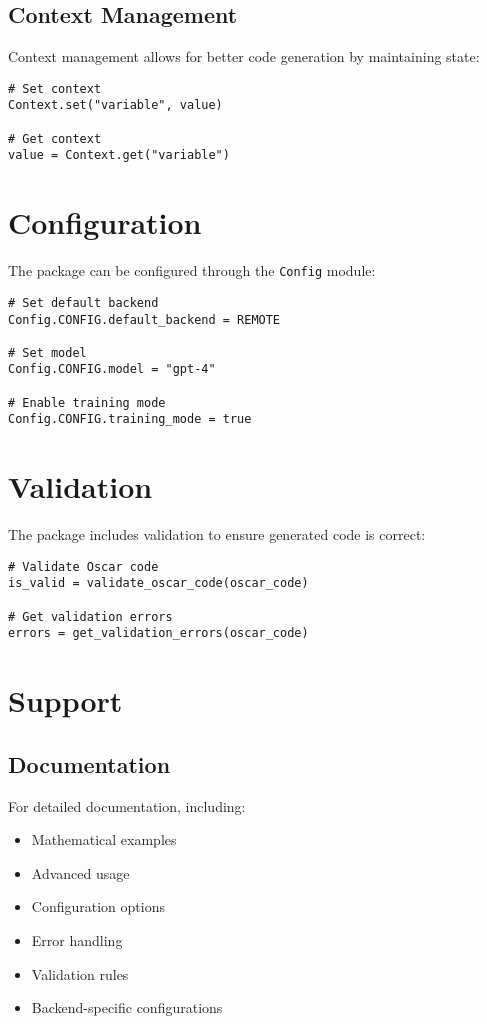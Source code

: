 \documentclass[11pt,a4paper]{article}
\newcommand{\modname}[1]{\texttt{#1}}
\begin{document}
\subsection{Context Management}

Context management allows for better code generation by maintaining state:

\begin{lstlisting}
# Set context
Context.set("variable", value)

# Get context
value = Context.get("variable")
\end{lstlisting}

\section{Configuration}

The package can be configured through the \modname{Config} module:

\begin{lstlisting}
# Set default backend
Config.CONFIG.default_backend = REMOTE

# Set model
Config.CONFIG.model = "gpt-4"

# Enable training mode
Config.CONFIG.training_mode = true
\end{lstlisting}

\section{Validation}

The package includes validation to ensure generated code is correct:

\begin{lstlisting}
# Validate Oscar code
is_valid = validate_oscar_code(oscar_code)

# Get validation errors
errors = get_validation_errors(oscar_code)
\end{lstlisting}

\section{Support}
\label{sec:support}

\subsection{Documentation}
For detailed documentation, including:
\begin{itemize}
    \item Mathematical examples
    \item Advanced usage
    \item Configuration options
    \item Error handling
    \item Validation rules
    \item Backend-specific configurations
\end{itemize}
\end{document}
